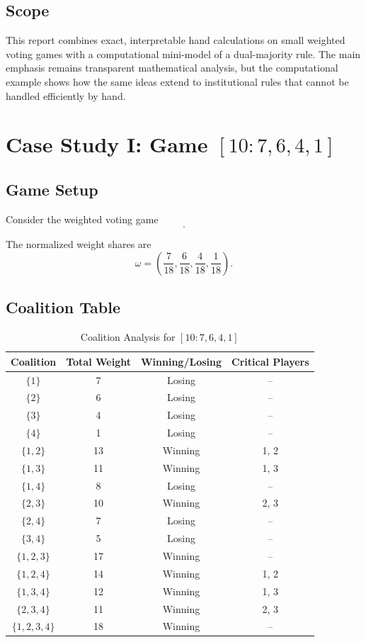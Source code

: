 \documentclass[lettersize,journal]{IEEEtran}
\begin{document}
\subsection{Scope}
This report combines exact, interpretable hand calculations on small weighted voting games with a computational mini-model of a dual-majority rule. The main emphasis remains transparent mathematical analysis, but the computational example shows how the same ideas extend to institutional rules that cannot be handled efficiently by hand.

\section{Case Study I: Game \texorpdfstring{$[10:7,6,4,1]$}{[10:7,6,4,1]}}

\subsection{Game Setup}
Consider the weighted voting game
\begin{equation}
[10:7,6,4,1].
\end{equation}

The normalized weight shares are
\begin{equation}
\omega=\left(\frac{7}{18},\frac{6}{18},\frac{4}{18},\frac{1}{18}\right).
\end{equation}

\subsection{Coalition Table}
\begin{table}[!t]
\caption{Coalition Analysis for $[10:7,6,4,1]$}
\label{tab:case1_coalitions}
\centering
\begin{tabular}{c c c c}
\toprule
Coalition & Total Weight & Winning/Losing & Critical Players \\
\midrule
$\{1\}$ & 7  & Losing  & -- \\
$\{2\}$ & 6  & Losing  & -- \\
$\{3\}$ & 4  & Losing  & -- \\
$\{4\}$ & 1  & Losing  & -- \\
$\{1,2\}$ & 13 & Winning & 1, 2 \\
$\{1,3\}$ & 11 & Winning & 1, 3 \\
$\{1,4\}$ & 8  & Losing  & -- \\
$\{2,3\}$ & 10 & Winning & 2, 3 \\
$\{2,4\}$ & 7  & Losing  & -- \\
$\{3,4\}$ & 5  & Losing  & -- \\
$\{1,2,3\}$ & 17 & Winning & -- \\
$\{1,2,4\}$ & 14 & Winning & 1, 2 \\
$\{1,3,4\}$ & 12 & Winning & 1, 3 \\
$\{2,3,4\}$ & 11 & Winning & 2, 3 \\
$\{1,2,3,4\}$ & 18 & Winning & -- \\
\bottomrule
\end{tabular}
\end{table}
\end{document}
